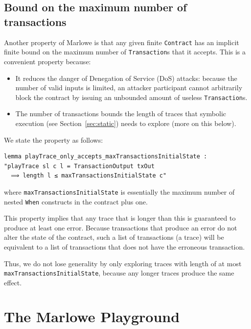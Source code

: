 \documentclass[runningheads]{llncs}
\begin{document}
\subsection{Bound on the maximum number of transactions\label{subsubsec:bound_max_transaction_number}}

Another property of Marlowe is that any given finite \texttt{Contract} has an implicit finite bound on the maximum number of \texttt{Transaction}s that it accepts. This is a convenient property because:

\begin{itemize}%
    \item It reduces the danger of Denegation of Service (DoS) attacks: because the number of valid inputs is limited, an attacker participant cannot arbitrarily block the contract by issuing an unbounded amount of useless \texttt{Transaction}s.
    \item The number of transactions bounds the length of traces that symbolic execution (see Section~\ref{sec:static}) needs to explore (more on this below).%
\end{itemize}

We state the property as follows:

\begin{verbatim}
lemma playTrace_only_accepts_maxTransactionsInitialState :
"playTrace sl c l = TransactionOutput txOut
  ⟹ length l ≤ maxTransactionsInitialState c"
\end{verbatim}

\noindent
where \texttt{maxTransactionsInitialState} is essentially the maximum number of nested \texttt{When} constructs in the contract plus one.

This property implies that any trace that is longer than this is guaranteed to produce at least one error. Because transactions that produce an error do not alter the state of the contract, such a list of transactions (a trace) will be equivalent to a list of transactions that does not have the erroneous transaction.

Thus, we do not lose generality by only exploring traces with length of at most \texttt{maxTransactionsInitialState}, because any longer traces produce the same effect.

\section{The Marlowe Playground}
\label{sec:playground}
\end{document}
